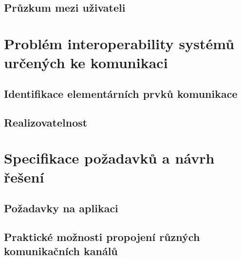 \documentclass[12pt,oneside,final]{fithesis2}
\begin{document}

\section{Průzkum mezi uživateli}



\chapter{Problém interoperability systémů určených ke komunikaci}

\section{Identifikace elementárních prvků komunikace}

\section{Realizovatelnost}



\chapter{Specifikace požadavků a návrh řešení}

\section{Požadavky na aplikaci}

\section{Praktické možnosti propojení různých komunikačních kanálů}
\end{document}
